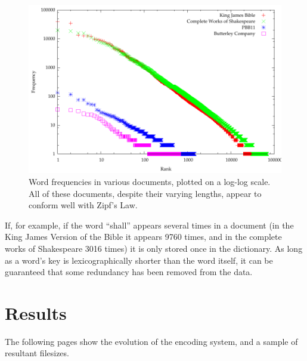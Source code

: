 \begin{figure}
  \begin{center}
  \includegraphics[width=\textwidth]{gfx/wordfreq}
  \end{center}
  \caption[Word frequencies in various documents]{Word frequencies in various documents, plotted on a log-log scale. All of these documents, despite their varying lengths, appear to conform well with Zipf's Law. }
  \label{fig:wordfreq}
\end{figure}

If, for example, if the word ``shall'' appears several times in a document (in the King James Version of the Bible it appears 9760 times, and in the complete works of Shakespeare 3016 times) it is only stored once in the dictionary. As long as a word's key is lexicographically shorter than the word itself, it can be guaranteed that some redundancy has been removed from the data.


\section{Results}

The following pages show the evolution of the encoding system, and a sample of resultant filesizes.

